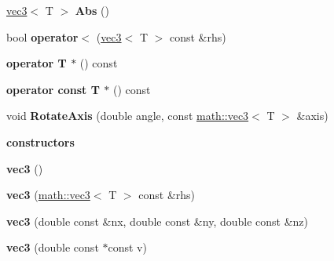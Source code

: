 \begin{DoxyCompactItemize}
\item 
\hypertarget{classmath_1_1vec3_aba9492a415256e0c647bcc719b914430}{
\hyperlink{classmath_1_1vec3}{vec3}$<$ T $>$ {\bfseries Abs} ()}
\label{classmath_1_1vec3_aba9492a415256e0c647bcc719b914430}

\item 
\hypertarget{classmath_1_1vec3_acb820fcead5ddafeb6dde5bc52807b06}{
bool {\bfseries operator$<$} (\hyperlink{classmath_1_1vec3}{vec3}$<$ T $>$ const \&rhs)}
\label{classmath_1_1vec3_acb820fcead5ddafeb6dde5bc52807b06}

\item 
\hypertarget{classmath_1_1vec3_a5e4169f776dad4d3f3364ba0289321cb}{
{\bfseries operator T $\ast$} () const }
\label{classmath_1_1vec3_a5e4169f776dad4d3f3364ba0289321cb}

\item 
\hypertarget{classmath_1_1vec3_af5a8cf41a9216e6f52e2f0a105f17ee2}{
{\bfseries operator const T $\ast$} () const }
\label{classmath_1_1vec3_af5a8cf41a9216e6f52e2f0a105f17ee2}

\item 
\hypertarget{classmath_1_1vec3_a6b660d27a7bf07fe8b5ac19f0fc8b908}{
void {\bfseries RotateAxis} (double angle, const \hyperlink{classmath_1_1vec3}{math::vec3}$<$ T $>$ \&axis)}
\label{classmath_1_1vec3_a6b660d27a7bf07fe8b5ac19f0fc8b908}

\end{DoxyCompactItemize}
\begin{Indent}{\bf constructors}\par
{\em \label{_amgrp0d8243d493859cb6cbec161117e79b0d}
 }\begin{DoxyCompactItemize}
\item 
\hypertarget{classmath_1_1vec3_a1c9db4362d233790c6d8f4a896b77a3f}{
{\bfseries vec3} ()}
\label{classmath_1_1vec3_a1c9db4362d233790c6d8f4a896b77a3f}

\item 
\hypertarget{classmath_1_1vec3_a6faf6197cea623fc525e7b45fe7a5708}{
{\bfseries vec3} (\hyperlink{classmath_1_1vec3}{math::vec3}$<$ T $>$ const \&rhs)}
\label{classmath_1_1vec3_a6faf6197cea623fc525e7b45fe7a5708}

\item 
\hypertarget{classmath_1_1vec3_a6a8c24654f1cd0904bec64f5a96b9649}{
{\bfseries vec3} (double const \&nx, double const \&ny, double const \&nz)}
\label{classmath_1_1vec3_a6a8c24654f1cd0904bec64f5a96b9649}

\item 
\hypertarget{classmath_1_1vec3_a0aa664d081e6235be5a4d70245023a75}{
{\bfseries vec3} (double const $\ast$const v)}
\label{classmath_1_1vec3_a0aa664d081e6235be5a4d70245023a75}

\end{DoxyCompactItemize}
\end{Indent}
